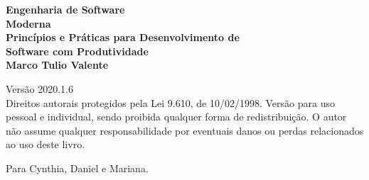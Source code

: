 \thispagestyle{empty}



\newpage
\thispagestyle{empty}
\vspace*{4cm}
\begin{center}
{\Huge \bf  Engenharia de Software\\[.3cm] Moderna}\\ 
\vspace*{1cm}
{\Large \bf  Princípios e Práticas para Desenvolvimento de\\[.3cm] Software com Produtividade}\\ 
\vspace*{3cm}
{\Large \bf Marco Tulio Valente}
\end{center}
\newpage

\newpage
\thispagestyle{empty}
\vspace*{3cm}
\begin{center}
{\Large  Versão 2020.1.6}\\ 
\vspace*{1cm}
{Direitos autorais protegidos pela Lei 9.610, de 10/02/1998. Versão para  uso pessoal e individual, sendo proibida qualquer forma de redistribuição. O autor não assume qualquer responsabilidade por eventuais danos ou perdas relacionados ao uso deste livro.}
\end{center}

\vspace*{3cm}




\newpage
\newpage

\thispagestyle{empty}
\vspace*{5cm}
\begin{center}
\large Para Cynthia, Daniel e Mariana.
\end{center}

\newpage
\newpage

\tableofcontents
